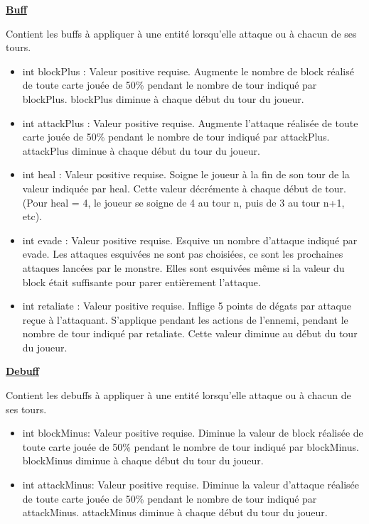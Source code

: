 \underline{\textbf{Buff}}
\par Contient les buffs à appliquer à une entité lorsqu'elle attaque ou à chacun de ses tours.
\begin{itemize}
    \item int blockPlus : Valeur positive requise. Augmente le nombre de block réalisé de toute carte jouée de 50\% pendant le nombre de tour indiqué par blockPlus. blockPlus diminue à chaque début du tour du joueur.
    \item int attackPlus : Valeur positive requise. Augmente  l'attaque réalisée de toute carte jouée de 50\% pendant le nombre de tour indiqué par attackPlus. attackPlus diminue à chaque début du tour du joueur.
    \item int heal : Valeur positive requise. Soigne le joueur à la fin de son tour de la valeur indiquée par heal. Cette valeur décrémente à chaque début de tour. (Pour heal = 4, le joueur se soigne de 4 au tour n, puis de 3 au tour n+1, etc).
    \item int evade : Valeur positive requise. Esquive un nombre d'attaque indiqué par evade. Les attaques esquivées ne sont pas choisiées, ce sont les prochaines attaques lancées par le monstre. Elles sont esquivées même si la valeur du block était suffisante pour parer entièrement l'attaque.
    \item int retaliate : Valeur positive requise. Inflige 5 points de dégats par attaque reçue à l'attaquant. S'applique pendant les actions de l'ennemi, pendant le nombre de tour indiqué par retaliate. Cette valeur diminue au début du tour du joueur.
\end{itemize}

\underline{\textbf{Debuff}}
\par Contient les debuffs à appliquer à une entité lorsqu'elle attaque ou à chacun de ses tours.
\begin{itemize}
    \item int blockMinus: Valeur positive requise. Diminue la valeur de block réalisée de toute carte jouée de 50\% pendant le nombre de tour indiqué par blockMinus. blockMinus diminue à chaque début du tour du joueur.
    \item int attackMinus: Valeur positive requise. Diminue la valeur d'attaque réalisée de toute carte jouée de 50\% pendant le nombre de tour indiqué par attackMinus. attackMinus diminue à chaque début du tour du joueur.
\end{itemize}

